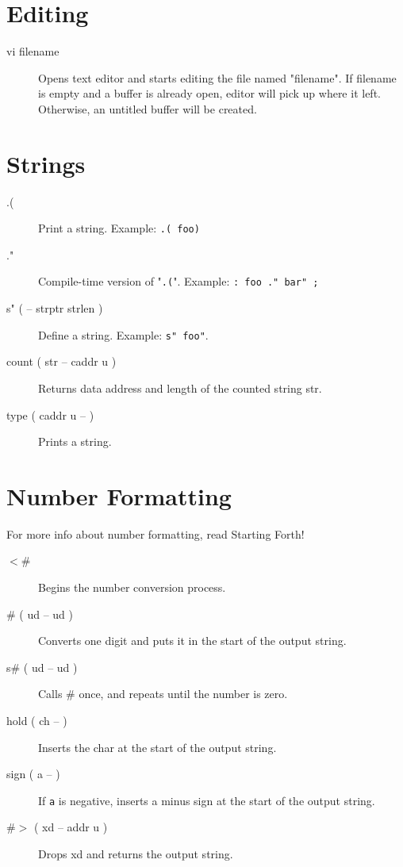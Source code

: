 \section{Editing}

\begin{description}
\item[vi filename]

Opens text editor and starts editing the file named "filename".
If filename is empty and a buffer is already open, editor will pick up where it left.
Otherwise, an untitled buffer will be created.

\end{description}

\section{Strings}

\begin{description}
\item[.(]

Print a string. Example: \texttt{.( foo)}

\item[."]

Compile-time version of "\texttt{.(}". Example: \texttt{: foo ." bar" ;}

\item[s" ( -- strptr strlen )] Define a string. Example: \texttt{s" foo"}.

\item[count ( str -- caddr u )] Returns data address and length of the counted string str.

\item[type ( caddr u -- )] Prints a string.

\end{description}

\section{Number Formatting}

For more info about number formatting, read Starting Forth!

\begin{description}

\item[$<$\#] Begins the number conversion process.
\item[\# ( ud -- ud )] Converts one digit and puts it in the start of the output string.
\item[s\# ( ud -- ud )] Calls \# once, and repeats until the number is zero.
\item[hold ( ch -- )] Inserts the char at the start of the output string.
\item[sign ( a -- )] If \texttt{a} is negative, inserts a minus sign at the start of the output string.
\item[\#$>$ ( xd -- addr u )] Drops xd and returns the output string.

\end{description}

